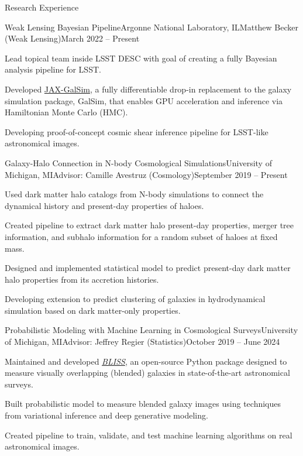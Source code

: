 \documentclass{resume} %
\begin{document}
\begin{rSection}{Research Experience}

\begin{rSubsection}{Weak Lensing Bayesian Pipeline}{Argonne National Laboratory, IL}{Matthew Becker (Weak Lensing)}{March 2022 -- Present}
\item Lead topical team inside LSST DESC with goal of creating a fully Bayesian analysis pipeline for LSST.
\item Developed \href{https://github.com/GalSim-developers/JAX-GalSim}{JAX-GalSim}, a fully differentiable drop-in replacement to the galaxy simulation package, GalSim, that enables GPU acceleration and inference via Hamiltonian Monte Carlo (HMC).
\item Developing proof-of-concept cosmic shear inference pipeline for LSST-like astronomical images.
\end{rSubsection}

\begin{rSubsection}{Galaxy-Halo Connection in N-body Cosmological Simulations}{University of Michigan, MI}{Advisor: Camille Avestruz (Cosmology)}{September 2019 -- Present}
\item Used dark matter halo catalogs from N-body simulations to connect the dynamical history and present-day properties of haloes.
\item Created pipeline to extract dark matter halo present-day properties, merger tree information, and subhalo information for a random subset of haloes at fixed mass.
\item Designed and implemented statistical model to predict present-day dark matter halo properties from its accretion histories.
\item Developing extension to predict clustering of galaxies in hydrodynamical simulation based on dark matter-only properties. 
\end{rSubsection}

\begin{rSubsection}{Probabilistic Modeling with Machine Learning in Cosmological Surveys}{University of Michigan, MI}{Advisor: Jeffrey Regier (Statistics)}{October 2019 -- June 2024}
\item Maintained and developed \textit{\href{https://github.com/prob-ml/bliss}{BLISS}}, an open-source Python package designed to measure visually overlapping (blended) galaxies in state-of-the-art astronomical surveys.
\item Built probabilistic model to measure blended galaxy images using techniques from variational inference and deep generative modeling.
\item Created pipeline to train, validate, and test machine learning algorithms on real astronomical images.
\end{rSubsection}


\end{rSection}
\end{document}
